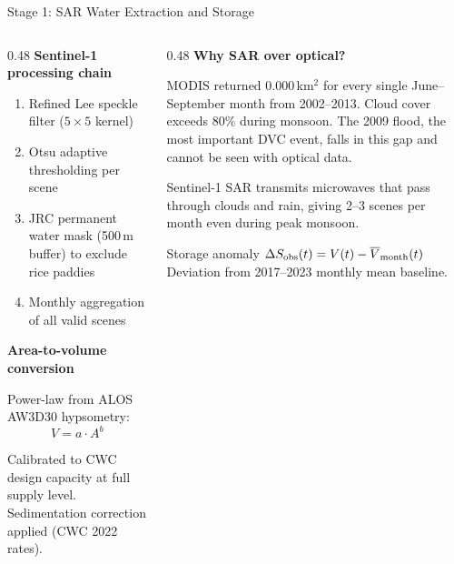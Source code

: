 \documentclass[10pt]{beamer}
\begin{document}
\begin{frame}{Stage 1: SAR Water Extraction and Storage}
  \begin{columns}[T]
    \begin{column}{0.48\textwidth}
      \small\textbf{Sentinel-1 processing chain}
      \begin{enumerate}\footnotesize
        \item Refined Lee speckle filter ($5 \times 5$ kernel)
        \item Otsu adaptive thresholding per scene
        \item JRC permanent water mask (500\,m buffer)
              to exclude rice paddies
        \item Monthly aggregation of all valid scenes
      \end{enumerate}

      \vspace{4pt}
      \small\textbf{Area-to-volume conversion}

      \footnotesize
      Power-law from ALOS AW3D30 hypsometry:
      $$V = a \cdot A^{b}$$

      Calibrated to CWC design capacity at full supply level.
      Sedimentation correction applied (CWC 2022 rates).
    \end{column}
    \begin{column}{0.48\textwidth}
      \small\textbf{Why SAR over optical?}

      \footnotesize
      MODIS returned 0.000\,km$^2$ for every single
      June--September month from 2002--2013.
      Cloud cover exceeds 80\% during monsoon.
      The 2009 flood, the most important DVC event,
      falls in this gap and cannot be seen with optical data.

      \vspace{4pt}
      Sentinel-1 SAR transmits microwaves that pass through
      clouds and rain, giving 2--3 scenes per month even
      during peak monsoon.

      \vspace{4pt}
      \begin{block}{\small Storage anomaly}
        \footnotesize
        $\Delta S_{\rm obs}(t) = V(t) - \overline{V}_{\rm month}(t)$\\[2pt]
        Deviation from 2017--2023 monthly mean baseline.
      \end{block}
    \end{column}
  \end{columns}
\end{frame}
\end{document}

